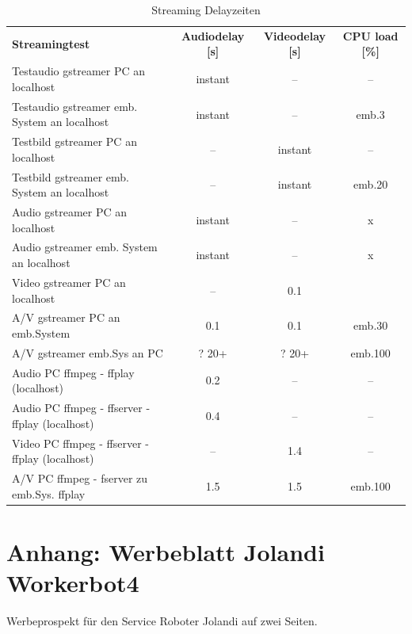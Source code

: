 \begin{table}[H]
\centering
 \begin{tabular}{l|c|c|c}
 \textbf{Streamingtest}&\textbf{Audiodelay [s]}&\textbf{Videodelay [s]} & \textbf{CPU load [\%]}\\
\cline{1-4} 
 Testaudio gstreamer PC an localhost          & instant   & --    & --\\
 Testaudio gstreamer emb. System an localhost & instant   & --    & emb.3\\
 Testbild gstreamer PC an localhost           & --        & instant & -- \\
 Testbild gstreamer emb. System an localhost  & --        & instant & emb.20 \\                        
 Audio gstreamer PC an localhost              & instant   & --    & x\\
 Audio gstreamer emb. System an localhost     & instant   & --    & x\\
 Video gstreamer PC an localhost              & --        & 0.1   &  \\
 A/V gstreamer PC an emb.System               & 0.1       & 0.1   & emb.30 \\
 A/V gstreamer emb.Sys an PC                  & ? 20+     & ? 20+ & emb.100\\ 
 \cline{1-4}
 Audio PC ffmpeg - ffplay (localhost)            & 0.2   & --   & --  \\
 Audio PC ffmpeg - ffserver - ffplay (localhost) & 0.4   & --   & --  \\
 Video PC ffmpeg - ffserver - ffplay (localhost) & --   & 1.4  & -- \\
 A/V PC ffmpeg - fserver zu emb.Sys. ffplay     & 1.5    & 1.5  & emb.100 \\
\end{tabular}

     \caption{Streaming Delayzeiten}
     \label{tbl:beispieltabelle}
   \end{table}

\newpage
\section{Anhang: Werbeblatt Jolandi Workerbot4}
Werbeprospekt für den Service Roboter Jolandi auf zwei Seiten.\\

